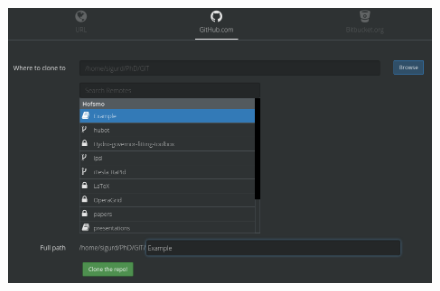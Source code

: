 \begin{frame}
\begin{columns}
\begin{column}{0.6\textwidth}
\begin{figure}
\begin{overprint}
					\includegraphics[width=\textwidth]{./pictures/kraken_clone.png}
				\end{overprint}
			\end{figure}
		\end{column}
	\end{columns}
\end{frame}
